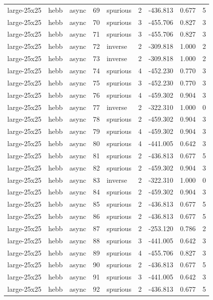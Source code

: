\begin{tabular}{lllrlrrrr}
large-25x25 & hebb & async & 69 & spurious & 2 & -436.813 & 0.677 & 5 \\
large-25x25 & hebb & async & 70 & spurious & 3 & -455.706 & 0.827 & 3 \\
large-25x25 & hebb & async & 71 & spurious & 3 & -455.706 & 0.827 & 3 \\
large-25x25 & hebb & async & 72 & inverse & 2 & -309.818 & 1.000 & 2 \\
large-25x25 & hebb & async & 73 & inverse & 2 & -309.818 & 1.000 & 2 \\
large-25x25 & hebb & async & 74 & spurious & 4 & -452.230 & 0.770 & 3 \\
large-25x25 & hebb & async & 75 & spurious & 3 & -452.230 & 0.770 & 3 \\
large-25x25 & hebb & async & 76 & spurious & 4 & -459.302 & 0.904 & 3 \\
large-25x25 & hebb & async & 77 & inverse & 2 & -322.310 & 1.000 & 0 \\
large-25x25 & hebb & async & 78 & spurious & 2 & -459.302 & 0.904 & 3 \\
large-25x25 & hebb & async & 79 & spurious & 4 & -459.302 & 0.904 & 3 \\
large-25x25 & hebb & async & 80 & spurious & 4 & -441.005 & 0.642 & 3 \\
large-25x25 & hebb & async & 81 & spurious & 2 & -436.813 & 0.677 & 5 \\
large-25x25 & hebb & async & 82 & spurious & 2 & -459.302 & 0.904 & 3 \\
large-25x25 & hebb & async & 83 & inverse & 2 & -322.310 & 1.000 & 0 \\
large-25x25 & hebb & async & 84 & spurious & 2 & -459.302 & 0.904 & 3 \\
large-25x25 & hebb & async & 85 & spurious & 2 & -436.813 & 0.677 & 5 \\
large-25x25 & hebb & async & 86 & spurious & 2 & -436.813 & 0.677 & 5 \\
large-25x25 & hebb & async & 87 & spurious & 2 & -253.120 & 0.786 & 2 \\
large-25x25 & hebb & async & 88 & spurious & 3 & -441.005 & 0.642 & 3 \\
large-25x25 & hebb & async & 89 & spurious & 4 & -455.706 & 0.827 & 3 \\
large-25x25 & hebb & async & 90 & spurious & 2 & -436.813 & 0.677 & 5 \\
large-25x25 & hebb & async & 91 & spurious & 3 & -441.005 & 0.642 & 3 \\
large-25x25 & hebb & async & 92 & spurious & 2 & -436.813 & 0.677 & 5 \\

\end{tabular}
